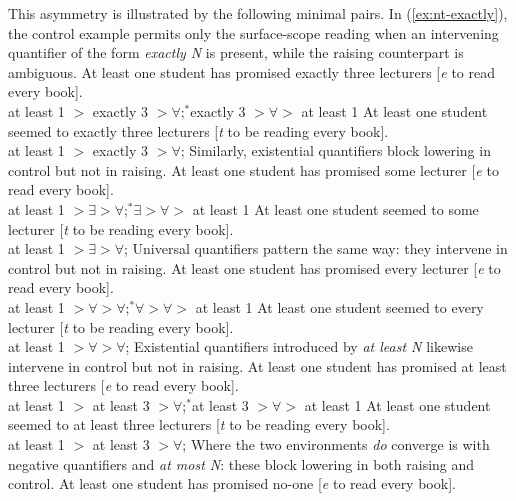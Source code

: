 \documentclass[12pt]{article}
\begin{document}
This asymmetry is illustrated by the following minimal pairs. In (\ref{ex:nt-exactly}), the control example permits only the surface-scope reading when an intervening quantifier of the form \emph{exactly N} is present, while the raising counterpart is ambiguous.
%
\pex\label{ex:nt-exactly}
\a At least one student has promised exactly three lecturers [\emph{e} to read every book].\\
at least 1 $>$ exactly 3 $> \forall$;\quad $^*$exactly 3 $> \forall >$ at least 1
\a At least one student seemed to exactly three lecturers [\emph{t} to be reading every book].\\
at least 1 $>$ exactly 3 $> \forall$;
\xe
%
Similarly, existential quantifiers block lowering in control but not in raising.
%
\pex\label{ex:nt-some}
\a At least one student has promised some lecturer [\emph{e} to read every book].\\
at least 1 $> \exists > \forall$;\quad $^*\exists > \forall >$ at least 1
\a At least one student seemed to some lecturer [\emph{t} to be reading every book].\\
at least 1 $> \exists > \forall$;
\xe
%
Universal quantifiers pattern the same way: they intervene in control but not in raising.
%
\pex\label{ex:nt-every}
\a At least one student has promised every lecturer [\emph{e} to read every book].\\
at least 1 $> \forall > \forall$;\quad $^*\forall > \forall >$ at least 1
\a At least one student seemed to every lecturer [\emph{t} to be reading every book].\\
at least 1 $> \forall > \forall$;
\xe
%
Existential quantifiers introduced by \emph{at least N} likewise intervene in control but not in raising.
%
\pex\label{ex:nt-atleast}
\a At least one student has promised at least three lecturers [\emph{e} to read every book].\\
at least 1 $>$ at least 3 $> \forall$;\quad $^*$at least 3 $> \forall >$ at least 1
\a At least one student seemed to at least three lecturers [\emph{t} to be reading every book].\\
at least 1 $>$ at least 3 $> \forall$;
\xe
%
Where the two environments \emph{do} converge is with negative quantifiers and \emph{at most N}: these block lowering in both raising and control.
%
\pex\label{ex:nt-neg}
\a At least one student has promised no-one [\emph{e} to read every book].\\
\end{document}

